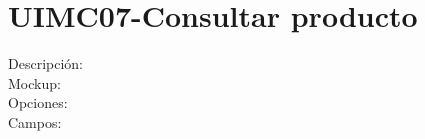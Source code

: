 
\section{UIMC07-Consultar producto}
\begin{description}
	\item[Descripción:]
	
	\item[Mockup:]\hspace{1pt}
	
	\item[Opciones:]
	
	\item[Campos:]

\end{description}
